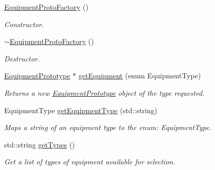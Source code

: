 \begin{DoxyCompactItemize}
\item 
\hypertarget{class_equipment_proto_factory_aa5d0da8b143ac289d645a22b26c37569}{}\hyperlink{class_equipment_proto_factory_aa5d0da8b143ac289d645a22b26c37569}{Equipment\+Proto\+Factory} ()\label{class_equipment_proto_factory_aa5d0da8b143ac289d645a22b26c37569}

\begin{DoxyCompactList}\small\item\em Constructor. \end{DoxyCompactList}\item 
\hypertarget{class_equipment_proto_factory_ad33d994f3281f492aaa3cd305889f780}{}\hyperlink{class_equipment_proto_factory_ad33d994f3281f492aaa3cd305889f780}{$\sim$\+Equipment\+Proto\+Factory} ()\label{class_equipment_proto_factory_ad33d994f3281f492aaa3cd305889f780}

\begin{DoxyCompactList}\small\item\em Destructor. \end{DoxyCompactList}\item 
\hypertarget{class_equipment_proto_factory_a18e0b0214b22722e59f80fef954da6e7}{}\hyperlink{class_equipment_prototype}{Equipment\+Prototype} $\ast$ \hyperlink{class_equipment_proto_factory_a18e0b0214b22722e59f80fef954da6e7}{get\+Equipment} (enum Equipment\+Type)\label{class_equipment_proto_factory_a18e0b0214b22722e59f80fef954da6e7}

\begin{DoxyCompactList}\small\item\em Returns a new \hyperlink{class_equipment_prototype}{Equipment\+Prototype} object of the type requested. \end{DoxyCompactList}\item 
\hypertarget{class_equipment_proto_factory_adccf993cd9070d41d4907bd6c8acb6c8}{}Equipment\+Type \hyperlink{class_equipment_proto_factory_adccf993cd9070d41d4907bd6c8acb6c8}{get\+Equipment\+Type} (std\+::string)\label{class_equipment_proto_factory_adccf993cd9070d41d4907bd6c8acb6c8}

\begin{DoxyCompactList}\small\item\em Maps a string of an equipment type to the enum\+: Equipment\+Type. \end{DoxyCompactList}\item 
\hypertarget{class_equipment_proto_factory_a85965709ee05ef53303c9448b35aea60}{}std\+::string \hyperlink{class_equipment_proto_factory_a85965709ee05ef53303c9448b35aea60}{get\+Types} ()\label{class_equipment_proto_factory_a85965709ee05ef53303c9448b35aea60}

\begin{DoxyCompactList}\small\item\em Get a list of types of equipment available for selection. \end{DoxyCompactList}\end{DoxyCompactItemize}


